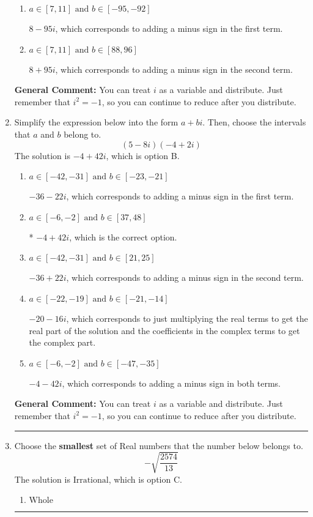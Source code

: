 \documentclass{extbook}[14pt]
\newcommand{\litem}[1]{\item #1

\rule{\textwidth}{0.4pt}}
\begin{document}
\begin{enumerate}
{\begin{enumerate}[label=\Alph*.]
 $-92 + 25 i$, which corresponds to adding a minus sign in both terms.
\item \( a \in [7, 11] \text{ and } b \in [-95, -92] \)

 $8 - 95 i$, which corresponds to adding a minus sign in the first term.
\item \( a \in [7, 11] \text{ and } b \in [88, 96] \)

 $8 + 95 i$, which corresponds to adding a minus sign in the second term.
\end{enumerate}

\textbf{General Comment:} You can treat $i$ as a variable and distribute. Just remember that $i^2=-1$, so you can continue to reduce after you distribute.
}
\litem{
Simplify the expression below into the form $a+bi$. Then, choose the intervals that $a$ and $b$ belong to.
\[ (5 - 8 i)(-4 + 2 i) \]The solution is \( -4 + 42 i \), which is option B.\begin{enumerate}[label=\Alph*.]
\item \( a \in [-42, -31] \text{ and } b \in [-23, -21] \)

 $-36 - 22 i$, which corresponds to adding a minus sign in the first term.
\item \( a \in [-6, -2] \text{ and } b \in [37, 48] \)

* $-4 + 42 i$, which is the correct option.
\item \( a \in [-42, -31] \text{ and } b \in [21, 25] \)

 $-36 + 22 i$, which corresponds to adding a minus sign in the second term.
\item \( a \in [-22, -19] \text{ and } b \in [-21, -14] \)

 $-20 - 16 i$, which corresponds to just multiplying the real terms to get the real part of the solution and the coefficients in the complex terms to get the complex part.
\item \( a \in [-6, -2] \text{ and } b \in [-47, -35] \)

 $-4 - 42 i$, which corresponds to adding a minus sign in both terms.
\end{enumerate}

\textbf{General Comment:} You can treat $i$ as a variable and distribute. Just remember that $i^2=-1$, so you can continue to reduce after you distribute.
}
\litem{
Choose the \textbf{smallest} set of Real numbers that the number below belongs to.
\[ -\sqrt{\frac{2574}{13}} \]The solution is \( \text{Irrational} \), which is option C.\begin{enumerate}[label=\Alph*.]
\item \( \text{Whole} \)


\end{enumerate}}
\end{enumerate}
\end{document}
